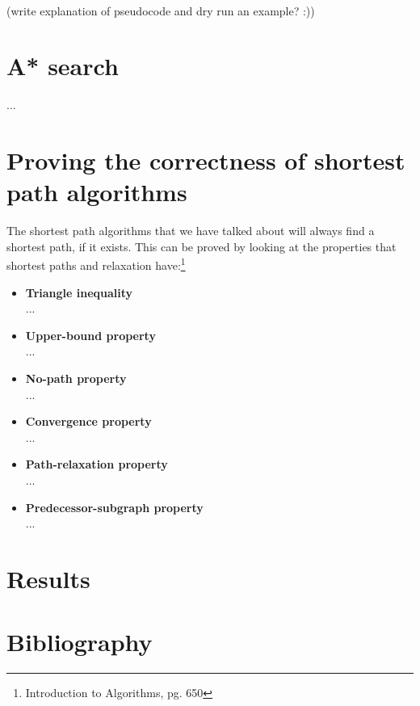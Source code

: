 \documentclass[11pt]{article}
\begin{document}
\noindent
\\
(write explanation of pseudocode and dry run an example? :))


\section{A* search}
...\\
\section{Proving the correctness of shortest path algorithms}
The shortest path algorithms that we have talked about will always find a shortest path, if it exists. This can be proved by looking at the properties that shortest paths and relaxation have:\footnote{Introduction to Algorithms, pg. 650}

\begin{itemize}
\item \textbf{Triangle inequality}\\
...
\item \textbf{Upper-bound property}\\
...
\item \textbf{No-path property}\\
...
\item \textbf{Convergence property}\\
...
\item \textbf{Path-relaxation property}\\
...
\item \textbf{Predecessor-subgraph property}\\
...
\end{itemize}


\section{Results}
\section{Bibliography}
\end{document}
